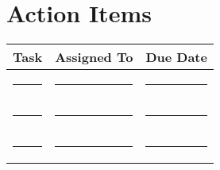 \documentclass[a4paper,10pt]{article}
\begin{document}
\vspace{0.2cm}

\section*{Action Items}
\begin{tabular}{@{}L{0.3\textwidth} L{0.3\textwidth} C{0.2\textwidth}@{}}
    \toprule
    \textbf{Task} & \textbf{Assigned To} & \textbf{Due Date} \\
    \midrule
    \rule{0.3\textwidth}{0.4pt} & \rule{0.3\textwidth}{0.4pt} & \rule{0.2\textwidth}{0.4pt} \\
    \rule{0.3\textwidth}{0.4pt} & \rule{0.3\textwidth}{0.4pt} & \rule{0.2\textwidth}{0.4pt} \\
    \rule{0.3\textwidth}{0.4pt} & \rule{0.3\textwidth}{0.4pt} & \rule{0.2\textwidth}{0.4pt} \\
    \bottomrule
\end{tabular}

\vspace{0.2cm}

\end{document}
